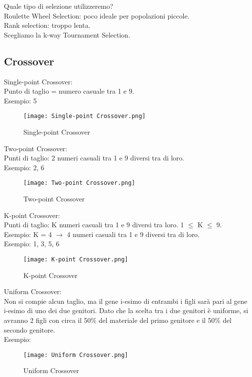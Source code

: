 \documentclass[10pt,a4paper]{article}
\begin{document}
    Quale tipo di selezione utilizzeremo?\\
    Roulette Wheel Selection: poco ideale per popolazioni piccole.\\
    Rank selection: troppo lenta.\\
    Scegliamo la k-way Tournament Selection.\\
    
    \subsection{Crossover}
    \label{Crossover}
    Single-point Crossover:\\
    Punto di taglio  = numero casuale tra 1 e 9.\\
    Esempio: 5
    \begin{figure}[h!]
      \centering
      \caption{Single-point Crossover}
      \texttt{[image: Single-point Crossover.png]}
      \label{Single-pointCrossover}
    \end{figure}
    
    
    Two-point Crossover:\\
    Punti di taglio: 2 numeri casuali tra 1 e 9 diversi tra di loro.\\
    Esempio: 2, 6
    \begin{figure}[h!]
      \centering
      \caption{Two-point Crossover}
      \texttt{[image: Two-point Crossover.png]}
      \label{Two-pointCrossover}
    \end{figure}
    
    \newpage
    
    K-point Crossover:\\
    Punti di taglio: K numeri casuali tra 1 e 9 diversi tra loro. 1 $\leq$ K $\leq$ 9.\\
    Esempio: K = 4 $\rightarrow$ 4 numeri casuali tra 1 e 9 diversi tra di loro.\\
    Esempio: 1, 3, 5, 6
    \begin{figure}[h!]
      \centering
      \caption{K-point Crossover}
      \texttt{[image: K-point Crossover.png]}
      \label{K-pointCrossover}
    \end{figure}
    
    Uniform Crossover:\\
    Non si compie alcun taglio, ma il gene i-esimo di entrambi i figli sarà pari al gene i-esimo di uno 
    dei due genitori. Dato che la scelta tra i due genitori è uniforme, si avranno 2 figli 
    con circa il 50\% del materiale del primo genitore e il 50\% del secondo genitore.\\
    Esempio:
    \begin{figure}[h!]
      \centering
      \caption{Uniform Crossover}
      \texttt{[image: Uniform Crossover.png]}
      \label{UniformCrossover}
    \end{figure}
    
\end{document}
